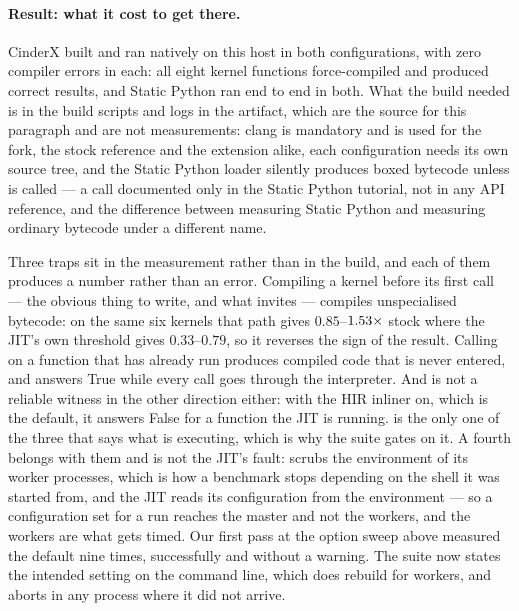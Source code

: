\paragraph{Result: what it cost to get there.}
CinderX built and ran natively on this host in both configurations, with zero compiler errors
in each: all eight kernel functions force-compiled and produced correct results, and Static
Python ran end to end in both. What the build needed is in the build scripts and logs in the
artifact, which are the source for this paragraph and are not measurements: clang is mandatory
and is used for the fork, the stock reference and the extension alike, each configuration needs
its own source tree, and the Static Python loader silently produces boxed bytecode unless
 is called --- a call documented only in the
Static Python tutorial, not in any API reference, and the
difference between measuring Static Python and measuring ordinary bytecode under a different
name.

Three traps sit in the measurement rather than in the build, and each of them produces a
number rather than an error. Compiling a kernel before its first call --- the obvious thing to
write, and what  invites --- compiles unspecialised bytecode: on the same
six kernels that path gives $0.85$--$\meas{ratio:b6_cinderx-jitopt_compile_at_first_call:matmul/jitopt_compile_at_first_call|b6_cinderx-stock:matmul/stock}{1.53}\times$ stock where the JIT's own threshold gives
$0.33$--$0.79$, so it reverses the sign of the result. Calling  on a
function that has already run produces compiled code that is never entered, and
 answers True while every call goes through the interpreter. And
 is not a reliable witness in the other direction either: with the HIR
inliner on, which is the default, it answers False for a function the JIT is running.
 is the only one of the three that says what is executing,
which is why the suite gates on it. A fourth belongs with them and is not the JIT's fault:
 scrubs the environment of its worker processes, which is how a benchmark stops
depending on the shell it was started from, and the JIT reads its configuration from the
environment --- so a configuration set for a run reaches the master and not the workers, and
the workers are what gets timed. Our first pass at the option sweep above measured the default
nine times, successfully and without a warning. The suite now states the intended setting on
the command line, which  does rebuild for workers, and aborts in any process where
it did not arrive.

